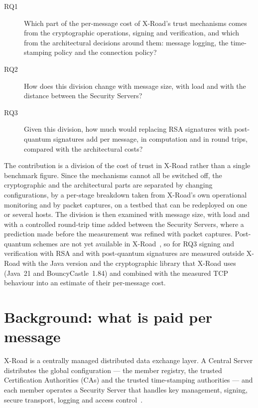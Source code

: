 \documentclass[conference,a4paper]{IEEEtran}
\newcommand{\newtext}[1]{{\color{blue}#1}}
\begin{document}
{\begin{description}
  \item[RQ1] Which part of the per-message cost of X-Road's trust mechanisms comes from the
  cryptographic operations, signing and verification, and which from the architectural decisions
  around them: message logging, the time-stamping policy and the connection policy?
  \item[RQ2] How does this division change with message size, with load and with the distance between
  the Security Servers?
  \item[RQ3] Given this division, how much would replacing RSA signatures with post-quantum signatures
  add per message, in computation and in round trips, compared with the architectural costs?
\end{description}

The contribution is a division of the cost of trust in X-Road rather than a single benchmark figure.
Since the mechanisms cannot all be switched off, the cryptographic and the architectural parts are
separated by changing configurations, by a per-stage breakdown taken from X-Road's own operational
monitoring and by packet captures, on a testbed that can be redeployed on one or several hosts. The
division is then examined with message size, with load and with a controlled round-trip time added
between the Security Servers, where a prediction made before the measurement was refined with packet
captures. Post-quantum schemes are not yet available in X-Road~\cite{bakhtina2026pqc,snetkov2023},
so for RQ3 signing and verification with RSA and with post-quantum signatures are measured outside
X-Road \newtext{with the Java version and the cryptographic library that X-Road uses (Java~21 and
BouncyCastle~1.84)} and combined with the measured TCP behaviour into an estimate of
their per-message cost.\par}

\section{Background: what is paid per message}\label{sec:bg}

X-Road is a centrally managed distributed data exchange layer. A Central Server distributes the
global configuration --- the member registry, the trusted Certification Authorities (CAs) and the
trusted time-stamping authorities --- and each member operates a Security Server that handles key
management, signing, secure transport, logging and access control~\cite{bakhtina2023ares,
xroadarcss}.
\end{document}
